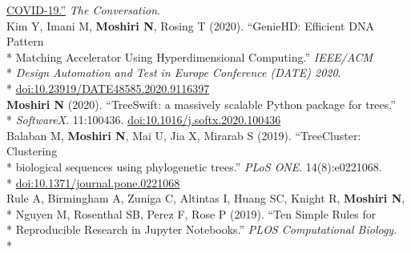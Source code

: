 \documentclass[margin,line]{res}
\begin{document}
\begin{resume}
\hspace*{8mm} \href{https://theconversation.com/heres-how-scientists-are-tracking-the-genetic-evolution-of-covid-19-134201}{COVID-19.''} \textit{The Conversation}.\\
\hspace*{4mm} Kim Y, Imani M, \textbf{Moshiri N}, Rosing T (2020). ``GenieHD: Efficient DNA Pattern\\*
\hspace*{9.5mm}  Matching Accelerator Using Hyperdimensional Computing.'' \textit{IEEE/ACM}\\*
\hspace*{9.5mm} \textit{Design Automation and Test in Europe Conference (DATE) 2020}.\\*\vspace{2mm}
\hspace*{8mm} \href{https://doi.org/10.23919/DATE48585.2020.9116397}{doi:10.23919/DATE48585.2020.9116397}\\
\hspace*{4mm} \textbf{Moshiri N} (2020). ``TreeSwift: a massively scalable Python package for trees.''\\*\vspace{2mm}
\hspace*{8mm} \textit{SoftwareX}. 11:100436. \href{https://doi.org/10.1016/j.softx.2020.100436}{doi:10.1016/j.softx.2020.100436}\\
\hspace*{4mm} Balaban M, \textbf{Moshiri N}, Mai U, Jia X, Mirarab S (2019). ``TreeCluster: Clustering\\*
\hspace*{9.5mm} biological sequences using phylogenetic trees.'' \textit{PLoS ONE}. 14(8):e0221068.\\*\vspace{2mm}
\hspace*{8mm} \href{https://doi.org/10.1371/journal.pone.0221068}{doi:10.1371/journal.pone.0221068}\\
\hspace*{4mm} Rule A, Birmingham A, Zuniga C, Altintas I, Huang SC, Knight R, \textbf{Moshiri N},\\*
\hspace*{9.5mm} Nguyen M, Rosenthal SB, Perez F, Rose P (2019). ``Ten Simple Rules for\\*
\hspace*{9.5mm} Reproducible Research in Jupyter Notebooks.'' \textit{PLOS Computational Biology}.\\*\vspace{2mm}

\end{resume}
\end{document}
